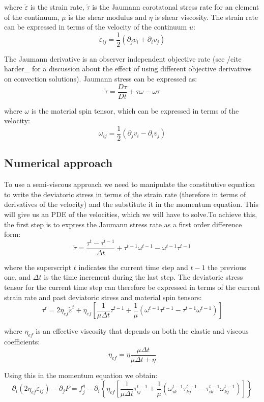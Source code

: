 where $\dot\varepsilon$ is the strain rate, $\check{\tau}$ is the Jaumann corotatonal stress rate for an element of the continuum, $\mu$ is the shear modulus and $\eta$ is shear viscosity. The strain rate can be expressed in terms of the velocity of the continuum $u$\-: \[ \dot \varepsilon_{ij} = \frac{1}{2} \left( \partial_j v_i + \partial_i v_j \right) \]

The Jaumann derivative is an observer independent objective rate (see /cite harder\-\_ for a discussion about the effect of using different objective derivatives on convection solutions). Jaumann stress can be expressed as\-: \[ \check{\tau} = \frac{D\tau}{Dt}+\tau\omega-\omega\tau\]

where $\omega$ is the material spin tensor, which can be expressed in terms of the velocity\-: \[\omega_{ij} = \frac{1}{2} \left( \partial_j v_i - \partial_i v_j \right) \]\hypertarget{index_num_approach}{}\subsection{Numerical approach}\label{index_num_approach}
To use a semi-\/viscous approach we need to manipulate the constitutive equation to write the deviatoric stress in terms of the strain rate (therefore in terms of derivatives of the velocity) and the substitute it in the momentum equation. This will give us an P\-D\-E of the velocities, which we will have to solve.\-To achieve this, the first step is to express the Jaumann stress rate as a first order difference form\-: \[\check{\tau} = \frac{\tau^t - \tau ^{t-1}}{\Delta t} + \tau^{t-1}\omega^{t-1} - \omega^{t-1}\tau^{t-1} \]

where the superscript $t$ indicates the current time step and $t-1$ the previous one, and $\Delta t$ is the time increment during the last step. The deviatoric stress tensor for the current time step can therefore be expressed in terms of the current strain rate and past deviatoric stress and material spin tensors\-: \[ \tau^t = 2 \eta_{ef} \dot\varepsilon^t + \eta_{ef} \left[\frac{1}{\mu\Delta t} \tau ^{t-1} + \frac {1}{\mu} \left( \omega^{t-1}\tau^{t-1} - \tau^{t-1}\omega^{t-1} \right) \right] \]

where $\eta_{ef}$ is an effective viscosity that depends on both the elastic and viscous coefficients\-: \[ \eta_{ef} = \eta \frac{\mu \Delta t}{\mu \Delta t + \eta} \]

Using this in the momentum equation we obtain\-: \[ \partial_i \left(2 \eta_{ef} \dot\varepsilon_{ij} \right) - \partial_j P = f^g_j - \partial_i \left\{ \eta_{ef} \left[\frac{1}{\mu\Delta t} \tau ^{t-1}_{ij} + \frac {1}{\mu} \left( \omega^{t-1}_{ik}\tau^{t-1}_{kj} - \tau^{t-1}_{ik}\omega^{t-1}_{kj} \right) \right] \right\} \]

